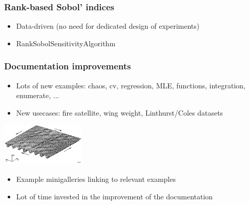 \documentclass[aspectratio=169]{beamer}
\begin{document}

\begin{frame}
\frametitle{Rank-based Sobol' indices}
\begin{itemize}
\item Data-driven (no need for dedicated design of experiments)
\item RankSobolSensitivityAlgorithm
\end{itemize}

\end{frame}


\begin{frame}
\frametitle{Documentation improvements}
\begin{itemize}
\item Lots of new examples: chaos, cv, regression, MLE, functions, integration, enumerate, ...
\item New usecases: fire satellite, wing weight, Linthurst/Coles datasets
\end{itemize}

\begin{center}
\includegraphics[width=0.3\textwidth]{figures/stiffened_panel_simulation}
\end{center}

\begin{itemize}
\item Example minigalleries linking to relevant examples
\item Lot of time invested in the improvement of the documentation
\end{itemize}
\end{frame}

\end{document}
